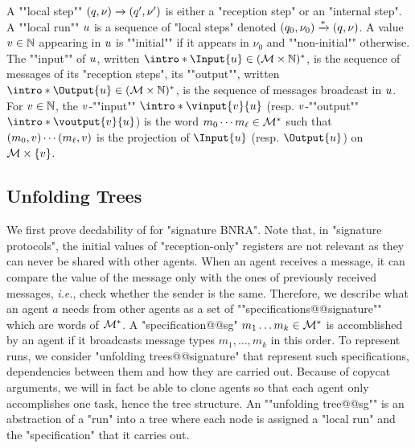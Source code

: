 	\AP A ""local step"" $(q,\nu) \xrightarrow{} (q',\nu')$ is either a "reception step" or an "internal step". 
	\AP A ""local run"" $u$ is a sequence of "local steps" denoted $(q_0, \nu_0) \xrightarrow{*} (q, \nu)$. %
	A value $v \in \mathbb{N}$ appearing in $u$ is ""initial"" if it appears in $\nu_0$ and ""non-initial"" otherwise. 
	The ""input"" of $u$, written $\intro*\Input{\localrun} \in (\messages \times \nats)^*$, is the sequence of messages of its "reception steps", its ""output"", written $\intro*\Output{\localrun} \in (\messages \times \nats)^*$, is the sequence of messages broadcast in $u$. 
	For $v \in \mathbb{N}$, the $v$-""input"" $\intro*\vinput{\aval}{\localrun}$ (resp. $v$-""output"" $\intro*\voutput{\aval}{\localrun}$) is the word $m_0 \cdots m_{\ell} \in \mathcal{M}^*$ such that $(m_0, v) \cdots (m_{\ell}, v)$ is the projection of $\Input{\localrun}$ (resp. $\Output{\localrun}$) on $\mathcal{M} \times \{v\}$.

\subsection{Unfolding Trees}
\label{sec:unfolding_tree_signature}

We first prove decdability of \COVER for "signature BNRA". Note that, in "signature protocols", the initial values of "reception-only" registers are not relevant as they can never be shared with other agents. When an agent receives a message, it can compare the value of the message only with the ones of previously received messages, \emph{i.e.}, check whether the sender is the same. Therefore, we describe what an agent $a$ needs from other agents as a set of ""specifications@@signature"" which are words of $\mathcal{M}^*$. A "specification@@sg" $m_1 \dots m_k \in \mathcal{M}^*$ is accomblished by an agent if it broadcasts message types $m_1, \dots, m_k$ in this order. To represent runs, we consider "unfolding trees@@signature" that represent such specifications, dependencies between them and how they are carried out. Because of copycat arguments, we will in fact be able to clone agents so that each agent only accomplishes one task, hence the tree structure.
An ""unfolding tree@@sg"" is an abstraction of a "run" into a tree where each node is assigned a "local run" and the "specification" that it carries out. 


